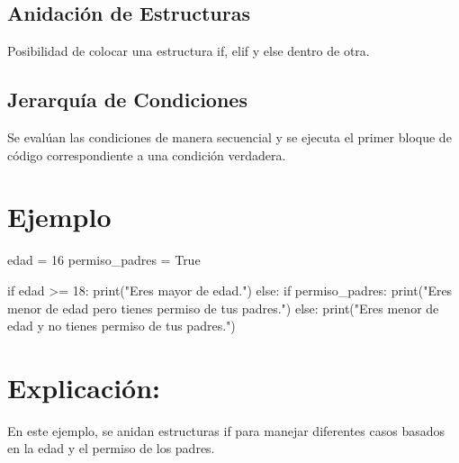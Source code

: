 \documentclass[
  a4paper,
  DIV=11,
  numbers=noendperiod,
  onepage,
  openany]{scrreprt}
\newenvironment{Shaded}{\begin{snugshade}}{\end{snugshade}}
\newcommand{\BuiltInTok}[1]{\textcolor[rgb]{0.00,0.23,0.31}{#1}}
\newcommand{\ControlFlowTok}[1]{\textcolor[rgb]{0.00,0.23,0.31}{#1}}
\newcommand{\DecValTok}[1]{\textcolor[rgb]{0.68,0.00,0.00}{#1}}
\newcommand{\NormalTok}[1]{\textcolor[rgb]{0.00,0.23,0.31}{#1}}
\newcommand{\OperatorTok}[1]{\textcolor[rgb]{0.37,0.37,0.37}{#1}}
\newcommand{\StringTok}[1]{\textcolor[rgb]{0.13,0.47,0.30}{#1}}
\newcommand{\VariableTok}[1]{\textcolor[rgb]{0.07,0.07,0.07}{#1}}
\begin{document}
\hypertarget{anidaciuxf3n-de-estructuras-1}{%
\subsection{Anidación de
Estructuras}\label{anidaciuxf3n-de-estructuras-1}}

Posibilidad de colocar una estructura if, elif y else dentro de otra.

\hypertarget{jerarquuxeda-de-condiciones-1}{%
\subsection{Jerarquía de
Condiciones}\label{jerarquuxeda-de-condiciones-1}}

Se evalúan las condiciones de manera secuencial y se ejecuta el primer
bloque de código correspondiente a una condición verdadera.

\hypertarget{ejemplo-33}{%
\section{Ejemplo}\label{ejemplo-33}}

\begin{Shaded}
\begin{Highlighting}[]
\NormalTok{edad }\OperatorTok{=} \DecValTok{16}
\NormalTok{permiso\_padres }\OperatorTok{=} \VariableTok{True}

\ControlFlowTok{if}\NormalTok{ edad }\OperatorTok{\textgreater{}=} \DecValTok{18}\NormalTok{:}
    \BuiltInTok{print}\NormalTok{(}\StringTok{"Eres mayor de edad."}\NormalTok{)}
\ControlFlowTok{else}\NormalTok{:}
    \ControlFlowTok{if}\NormalTok{ permiso\_padres:}
        \BuiltInTok{print}\NormalTok{(}\StringTok{"Eres menor de edad pero tienes permiso de tus padres."}\NormalTok{)}
    \ControlFlowTok{else}\NormalTok{:}
        \BuiltInTok{print}\NormalTok{(}\StringTok{"Eres menor de edad y no tienes permiso de tus padres."}\NormalTok{)}
\end{Highlighting}
\end{Shaded}

\hypertarget{explicaciuxf3n-33}{%
\section{Explicación:}\label{explicaciuxf3n-33}}

En este ejemplo, se anidan estructuras if para manejar diferentes casos
basados en la edad y el permiso de los padres.
\end{document}
